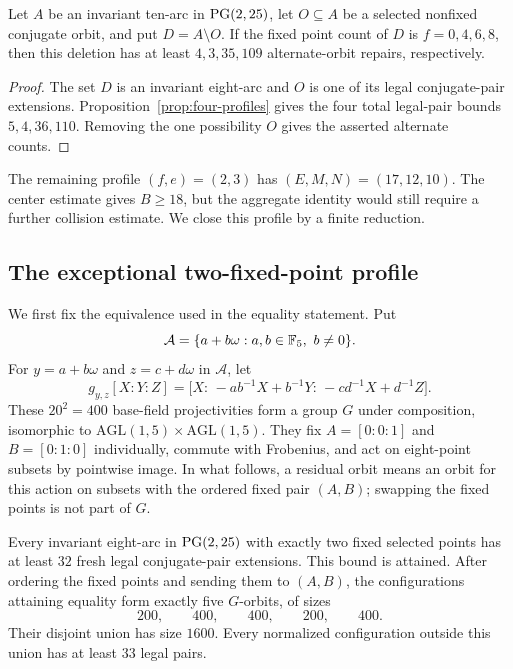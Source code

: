 \begin{corollary}
\label{cor:q25-nonexceptional-repair}
Let $A$ be an invariant ten-arc in $\operatorname{PG}(2,25)$, let $O\subseteq A$ be a
selected nonfixed conjugate orbit, and put $D=A\setminus O$.  If the fixed
point count of $D$ is $f=0,4,6,8$, then this deletion has at least
$4,3,35,109$ alternate-orbit repairs, respectively.
\end{corollary}

\begin{proof}
The set $D$ is an invariant eight-arc and $O$ is one of its legal
conjugate-pair extensions.  Proposition~\ref{prop:four-profiles} gives the
four total legal-pair bounds $5,4,36,110$.  Removing the one possibility
$O$ gives the asserted alternate counts.
\end{proof}

The remaining profile $(f,e)=(2,3)$ has $(E,M,N)=(17,12,10)$.  The center
estimate gives $B\ge18$, but the aggregate identity would still require a
further collision estimate.  We close this profile by a finite reduction.

\subsection*{The exceptional two-fixed-point profile}

We first fix the equivalence used in the equality statement.  Put
\[
 \mathcal A=\{a+b\omega:a,b\in\F_5,\ b\ne0\}.
\]
For $y=a+b\omega$ and $z=c+d\omega$ in $\mathcal A$, let
\begin{equation}\label{eq:residual-action}
 g_{y,z}[X:Y:Z]
  =\bigl[X:\,-ab^{-1}X+b^{-1}Y:\,-cd^{-1}X+d^{-1}Z\bigr].
\end{equation}
These $20^2=400$ base-field projectivities form a group $G$ under
composition, isomorphic to $\mathrm{AGL}(1,5)\times\mathrm{AGL}(1,5)$.  They fix
$A=[0:0:1]$ and $B=[0:1:0]$ individually, commute with Frobenius, and act on
eight-point subsets by pointwise image.  In what follows, a residual orbit
means an orbit for this action on subsets with the ordered fixed pair $(A,B)$;
swapping the fixed points is not part of $G$.

\begin{proposition}\label{prop:f2}
Every invariant eight-arc in $\operatorname{PG}(2,25)$ with exactly two fixed selected
points has at least $32$ fresh legal conjugate-pair extensions.  This bound
is attained.  After ordering the fixed points and sending them to $(A,B)$,
the configurations attaining equality form exactly five $G$-orbits, of sizes
\[
  200,\qquad 400,\qquad 400,\qquad 200,\qquad 400.
\]
Their disjoint union has size $1600$.  Every normalized configuration
outside this union has at least $33$ legal pairs.
\end{proposition}

